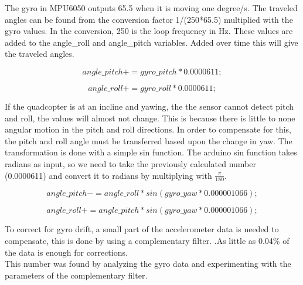 The gyro in MPU6050 outputs 65.5 when it is moving one degree/s. The traveled angles can be found from the conversion factor 1/(250*65.5) multiplied with the gyro values. In the conversion, 250 is the loop frequency in Hz. These values are added to the angle\_roll and angle\_pitch variables. Added over time this will give the traveled angles.

\begin{equation}
    angle\_pitch += gyro\_pitch * 0.0000611;
\end{equation}

\begin{equation}
    angle\_roll += gyro\_roll * 0.0000611;     
\end{equation}                           

If the quadcopter is at an incline and yawing, the the sensor cannot detect pitch and roll, the values will almost not change. This is because there is little to none angular motion in the pitch and roll directions. In order to compensate for this,  the pitch and roll angle must be transferred based upon the change in yaw. The transformation is done with a simple sin function. The arduino sin function takes radians as input, so we need to take the previously calculated number (0.0000611) and convert it to radians by multiplying with $\frac{\pi}{180}$.

\begin{equation}
    angle\_pitch -= angle\_roll * sin(gyro\_yaw * 0.000001066);
\end{equation}      

\begin{equation}
    angle\_roll += angle\_pitch * sin(gyro\_yaw * 0.000001066);     
\end{equation}      

To correct for gyro drift, a small part of the accelerometer data is needed to compensate, this is done by using a complementary filter. .As little as 0.04\% of the data is enough for corrections. \cite{gyroDriftTemp} \\
This number was found by analyzing the gyro data and experimenting with the parameters of the complementary filter.

